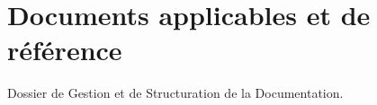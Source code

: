 \section{Documents applicables et de référence}
Dossier de Gestion et de Structuration de la Documentation.
